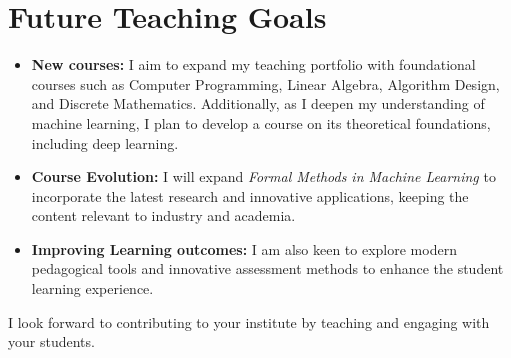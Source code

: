 \documentclass[11pt,a4paper,sans]{moderncv} %
\begin{document}
\section{Future Teaching Goals}
\begin{itemize}

\item \textbf{New courses:} I aim to expand my teaching portfolio with foundational courses such as Computer Programming, Linear Algebra, Algorithm Design, and Discrete Mathematics. Additionally, as I deepen my understanding of machine learning, I plan to develop a course on its theoretical foundations, including deep learning.

\item \textbf{Course Evolution:} I will expand \emph{Formal Methods in Machine Learning} to incorporate the latest research and innovative applications, keeping the content relevant to industry and academia.


\item \textbf{Improving Learning outcomes:} I am also keen to explore modern pedagogical tools and innovative assessment methods to enhance the student learning experience. \\
\end{itemize}

I look forward to contributing to your institute by teaching and engaging with your students.
\end{document}
